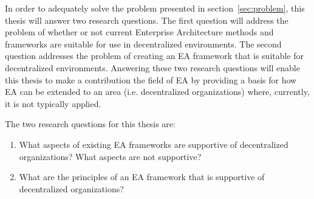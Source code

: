 In order to adequately solve the problem presented in section~\ref{sec:problem}, this thesis will answer two research questions. The first question will address the problem of whether or not current Enterprise Architecture methods and frameworks are suitable for use in decentralized environments. The second question addresses the problem of creating an EA framework that is suitable for decentralized environments. Answering these two research questions will enable this thesis to make a contribution the field of EA by providing a basis for how EA can be extended to an area (i.e. decentralized organizations) where, currently, it is not typically applied. 

The two research questions for this thesis are:

\begin{enumerate}
\item What aspects of existing EA frameworks are supportive of decentralized organizations? What aspects are not supportive?
\label{req:1}
\item What are the principles of an EA framework that is supportive of decentralized organizations?
\label{req:2}
\end{enumerate}

